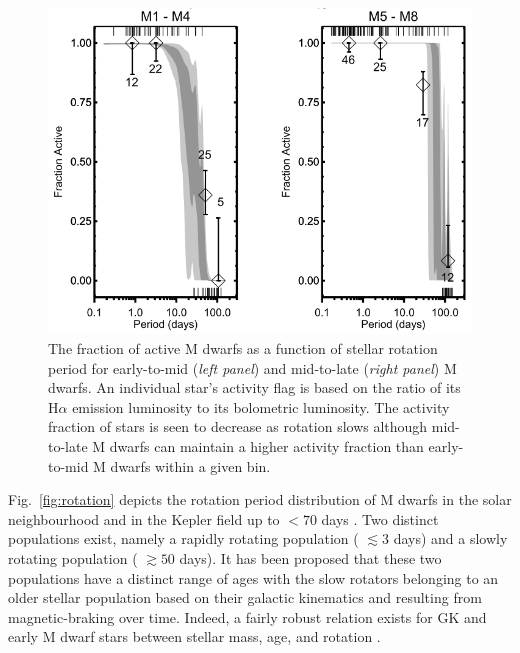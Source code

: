 \begin{figure}
  \centering
  \includegraphics[width=.8\textwidth]{figures/mdwarfactivity.png}
  \caption[M dwarf activity fraction versus spectral type and stellar rotation.]
      {The fraction of active M dwarfs as a function of stellar rotation period
    for early-to-mid (\emph{left panel}) and mid-to-late (\emph{right panel}) M
    dwarfs. An individual star's activity flag is based on the ratio of its H$\alpha$ emission
    luminosity to its bolometric luminosity.
    The activity fraction of stars is seen to decrease as rotation slows although mid-to-late M
    dwarfs can maintain a higher activity fraction than early-to-mid M dwarfs within a given
    \prot{} bin. \citep[Image credit:][]{west15}}
  \label{fig:activity}
\end{figure}

Fig.~\ref{fig:rotation} depicts the rotation period
distribution of M dwarfs in the solar neighbourhood \citep{newton16a} and in the Kepler
field up to \prot{} $< 70$ days \citep{mcquillan13a}.
Two distinct populations exist, namely a rapidly
rotating population (\prot{} $\lesssim 3$ days) and a slowly rotating population
(\prot{} $\gtrsim 50$ days). It has been proposed that these two populations
have a distinct range of ages with
the slow rotators belonging to an older stellar population based on their galactic
kinematics \citep{irwin11} and resulting from magnetic-braking over time.
Indeed, a fairly robust relation exists for GK and early M dwarf stars between stellar
mass, age, and rotation \citep[gyrochronology;][]{barnes03}. \\


